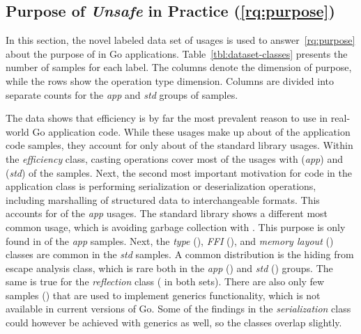 
\subsection{Purpose of \textit{Unsafe} in Practice (\ref{rq:purpose})}\label{subsec:go-geiger:qualitative-evaluation:purpose}

In this section, the novel labeled data set of \unsafe{} usages is used to answer~\ref{rq:purpose} about the purpose of
\unsafe{} in Go applications.
Table~\ref{tbl:dataset-classes} presents the number of samples for each label.
The columns denote the dimension of purpose, while the rows show the operation type dimension.
Columns are divided into separate counts for the \textit{app} and \textit{std} groups of samples.



The data shows that efficiency is by far the most prevalent reason to use \unsafe{} in real-world Go application code.
While these usages make up about  of the application code samples, they account for only about
 of the standard library usages.
Within the \textit{efficiency} class, casting operations cover most of the usages with  (\textit{app})
and  (\textit{std}) of the samples.
Next, the second most important motivation for \unsafe{} code in the application class is performing serialization or
deserialization operations, including marshalling of structured data to interchangeable formats.
This accounts for  of the \textit{app} usages.
The standard library shows a different most common usage, which is avoiding garbage collection with .
This purpose is only found in  of the \textit{app} samples.
Next, the \textit{type} (), \textit{\acrshort{FFI}} (), and \textit{memory layout}
() classes are common in the \textit{std} samples.
A common distribution is the hiding from escape analysis class, which is rare both in the \textit{app}
() and \textit{std} () groups.
The same is true for the \textit{reflection} class ( in both sets).
There are also only few samples () that are used to implement generics functionality, which is not
available in current versions of Go.
Some of the findings in the \textit{serialization} class could however be achieved with generics as well, so the classes
overlap slightly.

